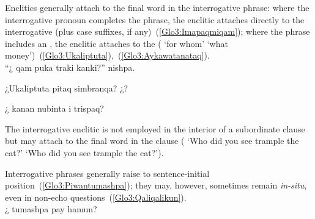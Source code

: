 {\noindent
Enclitics generally attach to the final word in the interrogative phrase: where the interrogative pronoun completes the phrase, the enclitic attaches directly to the interrogative (plus case suffixes, if any)~(\ref{Glo3:Imapaqmiqam}); where the phrase includes an , the enclitic attaches to the  ( ‘for whom’  ‘what money’)~(\ref{Glo3:Ukaliptuta}),~(\ref{Glo3:Aykawatanataq}).\\

%
{“¿ qam puka traki kanki?” nishpa.}%
{}%
{}{}%

%
{¿Ukaliptuta pitaq simbranqa? ¿?}%
{}%
{}{}%

%
{¿ kanan nubinta i trispaq?}%
{}%
{}{}%

\noindent
The interrogative enclitic is not employed in the interior of a subordinate clause but may attach to the final word in the clause (    ‘Who did you see trample the cat?’     ‘Who did you see trample the cat?’).

\noindent
Interrogative phrases generally raise to sentence-initial position~(\ref{Glo3:Piwantumashpa}); they may, however, sometimes remain \emph{in-situ}, even in non-echo questions~(\ref{Glo3:Qaliqalikun}).\\

%
{¿ tumashpa pay hamun?}%
{}%
{}{}%

}
